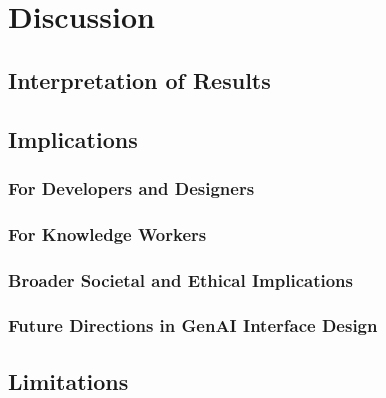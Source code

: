 
\chapter{Discussion}\label{chapter:discussion}

\section{Interpretation of Results}

\section{Implications}
\subsection{For Developers and Designers}
\subsection{For Knowledge Workers}
\subsection{Broader Societal and Ethical Implications}
\subsection{Future Directions in GenAI Interface Design}

\section{Limitations}